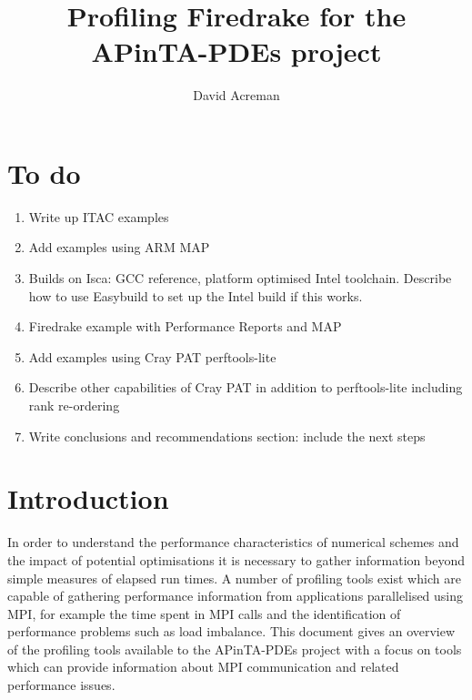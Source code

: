 \documentclass[a4paper,titlepage]{article}
\author{David Acreman}
\title{Profiling Firedrake for the APinTA-PDEs project}
\begin{document}
\pagestyle{fancy}
\lhead{}
\chead{}

\maketitle
\pagebreak
\tableofcontents
\pagebreak


\section*{To do}

\begin{enumerate}
\item Write up ITAC examples
\item Add examples using ARM MAP
\item Builds on Isca: GCC reference, platform optimised Intel toolchain. Describe how to use Easybuild to set up the Intel build if this works.
\item Firedrake example with Performance Reports and MAP
\item Add examples using Cray PAT perftools-lite
\item Describe other capabilities of Cray PAT in addition to perftools-lite including rank re-ordering
\item Write conclusions and recommendations section: include the next steps
\end{enumerate}

\pagebreak


\section{Introduction}

In order to understand the performance characteristics of numerical schemes and the impact of potential optimisations it is necessary to gather information beyond simple measures of elapsed run times. A number of profiling tools exist which are capable of gathering performance information from applications parallelised using MPI, for example the time spent in MPI calls and the identification of performance problems such as load imbalance. This document gives an overview of the profiling tools available to the APinTA-PDEs project with a focus on tools which can provide information about MPI communication and related performance issues. 
\end{document}
